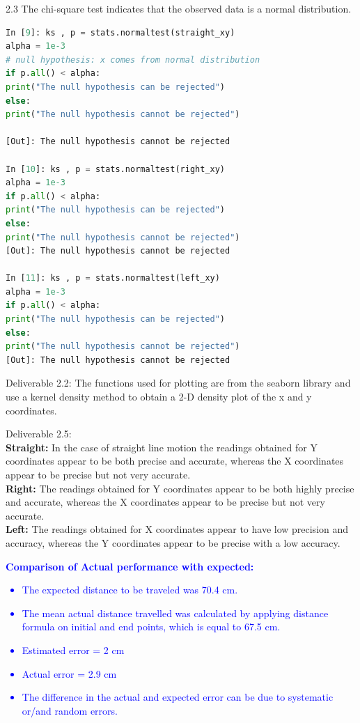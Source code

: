 \documentclass[11pt,a4paper]{article}
\begin{document}
			\begin{itemize}
				\item 2.3 The chi-square test indicates that the observed data is a normal distribution.
\begin{lstlisting}[language=Python]
In [9]: ks , p = stats.normaltest(straight_xy)
alpha = 1e-3
# null hypothesis: x comes from normal distribution
if p.all() < alpha: 
print("The null hypothesis can be rejected")
else:
print("The null hypothesis cannot be rejected")

[Out]: The null hypothesis cannot be rejected

In [10]: ks , p = stats.normaltest(right_xy)
alpha = 1e-3
if p.all() < alpha: 
print("The null hypothesis can be rejected")
else:
print("The null hypothesis cannot be rejected")
[Out]: The null hypothesis cannot be rejected

In [11]: ks , p = stats.normaltest(left_xy)
alpha = 1e-3
if p.all() < alpha: 
print("The null hypothesis can be rejected")
else:
print("The null hypothesis cannot be rejected")
[Out]: The null hypothesis cannot be rejected
\end{lstlisting}
				
				\item Deliverable 2.2: The functions used for plotting are from the seaborn library and use a kernel density method to obtain a 2-D density plot of the x and y coordinates. 
				\item Deliverable 2.5:\\
				
				\textbf{Straight:}  In the case of straight line motion the readings obtained for Y coordinates appear to be both precise and accurate, whereas the X coordinates appear to be precise but not very accurate. \\
				
				\textbf{Right:} The readings obtained for Y coordinates appear to be both highly precise and accurate, whereas the X coordinates appear to be precise but not very accurate. \\
				
				\textbf{Left:} The readings obtained for X coordinates appear to have low precision and accuracy, whereas the Y coordinates appear to be precise with a low accuracy.
				\textcolor{blue}{\item \textbf{Comparison of Actual performance with expected:} \begin{itemize} \item The expected distance to be traveled was 70.4 cm.
						\item The mean actual distance travelled was calculated by applying distance formula on initial and end points, which is equal to 67.5 cm.
						\item Estimated error = 2 cm
						\item Actual error = 2.9 cm
						\item The difference in the actual and expected error can be due to systematic or/and random errors.
					\end{itemize}}
				\end{itemize} 
				\newpage
\end{document}

